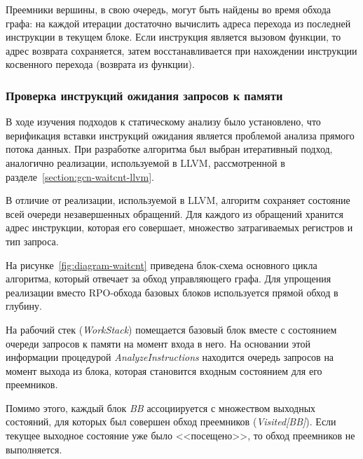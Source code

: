\documentclass[a4paper,14pt]{extarticle}
\begin{document}
{Преемники вершины, в свою очередь, могут быть найдены во время обхода графа:
на каждой итерации достаточно вычислить адреса перехода из последней инструкции в текущем блоке.
Если инструкция является вызовом функции, то адрес возврата сохраняется, затем восстанавливается
при нахождении инструкции косвенного перехода (возврата из функции).

\subsubsection{Проверка инструкций ожидания запросов к памяти}

В ходе изучения подходов к статическому анализу было установлено, что верификация
вставки инструкций ожидания является проблемой анализа прямого потока данных.
При разработке алгоритма был выбран итеративный подход, аналогично реализации,
используемой в LLVM, рассмотренной в разделе~\ref{section:gcn-waitcnt-llvm}.

В отличие от реализации, используемой в LLVM, алгоритм сохраняет состояние всей очереди
незавершенных обращений. Для каждого из обращений хранится адрес инструкции, которая его
совершает, множество затрагиваемых регистров и тип запроса.

На рисунке~\ref{fig:diagram-waitcnt} приведена блок-схема основного цикла
алгоритма, который отвечает за обход управляющего графа. Для упрощения реализации
вместо RPO-обхода базовых блоков используется прямой обход в глубину.

На рабочий стек (\textit{WorkStack}) помещается базовый блок вместе с состоянием
очереди запросов к памяти на момент входа в него. На основании этой информации
процедурой \textit{AnalyzeInstructions} находится очередь запросов на момент
выхода из блока, которая становится входным состоянием для его преемников.

Помимо этого, каждый блок \textit{BB} ассоциируется с множеством выходных состояний,
для которых был совершен обход преемников (\textit{Visited[BB]}). Если текущее выходное
состояние уже было <<посещено>>, то обход преемников не выполняется.

}
\end{document}
